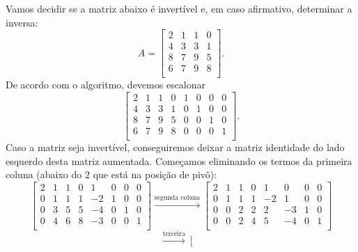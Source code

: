 \begin{ex}
	Vamos decidir se a matriz abaixo é invertível e, em caso afirmativo, determinar a inversa:
	\begin{equation}
	A =
	\left[
	\begin{array}{cccc}
	2 & 1 & 1 & 0 \\
	4 & 3 & 3 & 1 \\
	8 & 7 & 9 & 5 \\
	6 & 7 & 9 & 8 \\
	\end{array}
	\right].
	\end{equation} De acordo com o algoritmo, devemos escalonar
	\begin{equation}
	\left[
	\begin{array}{cccc|cccc}
	2 & 1 & 1 & 0 & 1 & 0 & 0 & 0 \\
	4 & 3 & 3 & 1 & 0 & 1 & 0 & 0 \\
	8 & 7 & 9 & 5 & 0 & 0 & 1 & 0 \\
	6 & 7 & 9 & 8 & 0 & 0 & 0 & 1 \\
	\end{array}
	\right].
	\end{equation} Caso a matriz seja invertível, conseguiremos deixar a matriz identidade do lado esquerdo desta matriz aumentada. Começamos eliminando os termos da primeira coluna (abaixo do $2$ que está na posição de pivô):
	\begin{equation}
	\left[
	\begin{array}{cccc|cccc}
	2 & 1 & 1 & 0 & 1 & 0 & 0 & 0 \\
	0 & 1 & 1 & 1 & -2 & 1 & 0 & 0 \\
	0 & 3 & 5 & 5 & -4 & 0 & 1 & 0 \\
	0 & 4 & 6 & 8 & -3 & 0 & 0 & 1 \\
	\end{array}
	\right] \xrightarrow{\text{segunda coluna}}
	\left[
	\begin{array}{cccc|cccc}
	2 & 1 & 1 & 0 & 1 & 0 & 0 & 0 \\
	0 & 1 & 1 & 1 & -2 & 1 & 0 & 0 \\
	0 & 0 & 2 & 2 & 2 & -3 & 1 & 0 \\
	0 & 0 & 2 & 4 & 5 & -4 & 0 & 1 \\
	\end{array}
	\right]
	\end{equation}
	\begin{equation}
	\xrightarrow{\text{terceira}}
	\left[
	\begin{array}{cccc|cccc}

\end{array}
\end{equation}
\end{ex}
